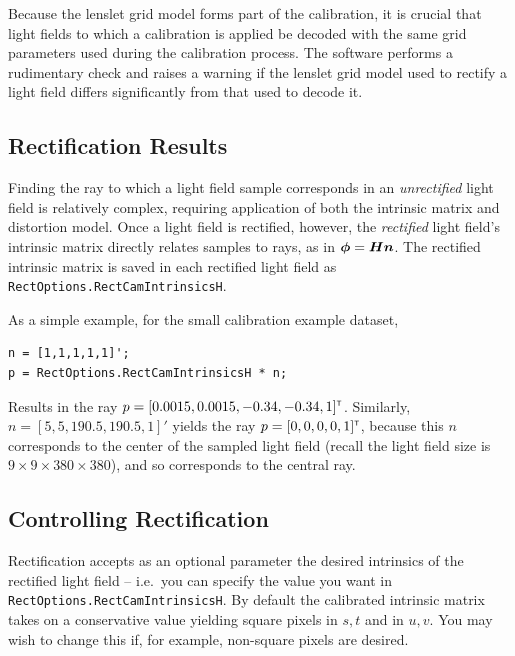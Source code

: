 \documentclass[onecolumn]{article}
\newcommand{\SymbolText}[1]{\texttt{\small #1}}
\begin{document}
Because the lenslet grid model forms part of the calibration, it is crucial that light fields to which a calibration is applied be decoded with the same grid parameters used during the calibration process. The software performs a rudimentary check and raises a warning if the lenslet grid model used to rectify a light field differs significantly from that used to decode it.


\subsection{Rectification Results}

Finding the ray to which a light field sample corresponds in an \emph{unrectified} light field is relatively complex, requiring application of both the intrinsic matrix and distortion model.  Once a light field is rectified, however, the \emph{rectified} light field's intrinsic matrix directly relates samples to rays, as in $\vect{\phi} = \mat{H} \vect{n}$.  The rectified intrinsic matrix is saved in each rectified light field as \SymbolText{RectOptions.RectCamIntrinsicsH}.

As a simple example, for the small calibration example dataset,
\begin{Verbatim}
n = [1,1,1,1,1]';
p = RectOptions.RectCamIntrinsicsH * n;
\end{Verbatim}

Results in the ray $p = [0.0015,0.0015, -0.34,-0.34, 1]^{\scriptscriptstyle\mathsf{T}}$. Similarly,\\ $n = [5,5,190.5,190.5,1]'$ yields the ray $p = [0,0,0,0,1]^{\scriptscriptstyle\mathsf{T}}$, because this $n$ corresponds to the center of the sampled light field (recall the light field size is $9 \times 9 \times 380 \times 380$), and so corresponds to the central ray.


\subsection{Controlling Rectification}

Rectification accepts as an optional parameter the desired intrinsics of the rectified light field -- i.e.\ you can specify the value you want in \SymbolText{RectOptions.RectCamIntrinsicsH}.  By default the calibrated intrinsic matrix takes on a conservative value yielding square pixels in $s,t$ and in $u,v$.  You may wish to change this if, for example, non-square pixels are desired.
\end{document}

